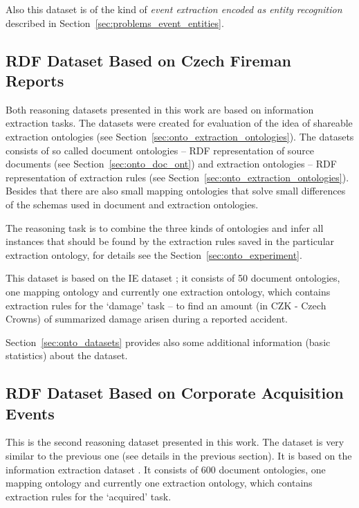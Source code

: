 Also this dataset is of the kind of \emph{event extraction encoded as entity recognition} described in Section~\ref{sec:problems_event_entities}.

\subsection{RDF Dataset Based on Czech Fireman Reports} \label{sec:data_rdf_fireman}

Both reasoning datasets presented in this work are based on information extraction tasks. The datasets were created for evaluation of the idea of shareable extraction ontologies (see Section~\ref{sec:onto_extraction_ontologies}). The datasets consists of so called document ontologies -- RDF representation of source documents (see Section~\ref{sec:onto_doc_ont}) and extraction ontologies -- RDF representation of extraction rules (see Section~\ref{sec:onto_extraction_ontologies}). Besides that there are also small mapping ontologies that solve small differences of the schemas used in document and extraction ontologies.

The reasoning task is to combine the three kinds of ontologies and infer all instances that should be found by the extraction rules saved in the particular extraction ontology, for details see the Section~\ref{sec:onto_experiment}.

This dataset is based on the IE dataset ; it consists of 50 document ontologies, one mapping ontology and currently one extraction ontology, which contains extraction rules for the `damage' task -- to find an amount (in CZK - Czech Crowns) of summarized damage arisen during a reported accident.

Section~\ref{sec:onto_datasets} provides also some additional information (basic statistics) about the dataset.


\subsection{RDF Dataset Based on Corporate Acquisition Events} \label{sec:data_rdf_acquisitions}

This is the second reasoning dataset presented in this work. The dataset is very similar to the previous one (see details in the previous section). It is based on the information extraction dataset . It consists of 600 document ontologies, one mapping ontology and currently one extraction ontology, which contains extraction rules for the `acquired' task.

